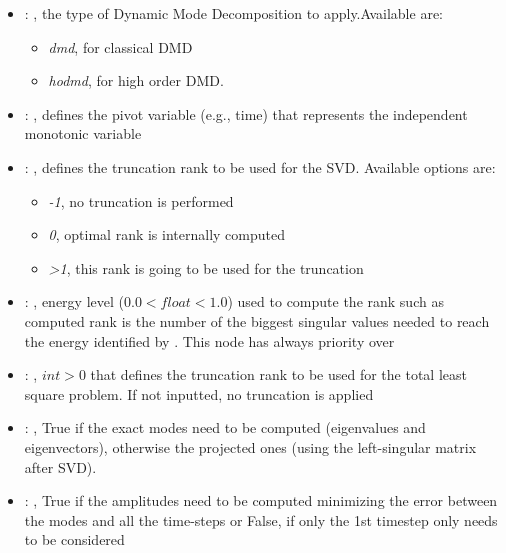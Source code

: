 \begin{itemize}
    \item {}: , 
      the type of Dynamic Mode Decomposition to apply.Available are:
      \begin{itemize}                                                     \item \textit{dmd}, for
      classical DMD                                                     \item \textit{hodmd}, for
      high order DMD.                                                   \end{itemize}

    \item {}: , 
      defines the pivot variable (e.g., time) that represents the
      independent monotonic variable

    \item {}: , 
      defines the truncation rank to be used for the SVD.
      Available options are:                                                  \begin{itemize}
      \item \textit{-1}, no truncation is performed
      \item \textit{0}, optimal rank is internally computed
      \item \textit{>1}, this rank is going to be used for the truncation
      \end{itemize}

    \item {}: , 
      energy level ($0.0 < float < 1.0$) used to compute the rank such
      as computed rank is the number of the biggest singular values needed to reach the energy
      identified by                                                    . This
      node has always priority over  

    \item {}: , 
      $int > 0$ that defines the truncation rank to be used for the total
      least square problem. If not inputted, no truncation is applied

    \item {}: , 
      True if the exact modes need to be computed (eigenvalues and
      eigenvectors),   otherwise the projected ones (using the left-singular matrix after SVD).

    \item {}: , 
      True if the amplitudes need to be computed minimizing the error
      between the modes and all the time-steps or False, if only the 1st timestep only needs to be
      considered
  \end{itemize}

